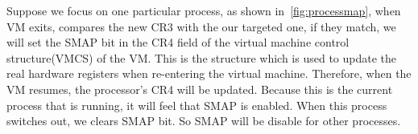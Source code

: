 Suppose we focus on one particular process, as shown in~\autoref{fig:processmap}, when VM exits, compares the new CR3 with the our targeted one, if they match, we will set the SMAP bit in the CR4 field of the virtual machine control structure(VMCS) of the VM. This is the structure which is used to update the real hardware registers when re-entering the virtual machine. Therefore, when the VM resumes, the processor's CR4 will be updated. Because this is the current process that is running, it will feel that SMAP is enabled. When this process switches out, we clears SMAP bit. So SMAP will be disable for other processes.

